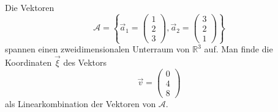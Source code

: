 \begin{beispiel}
Die Vektoren \[
\mathcal{A}=\left\{
\vec{a}_1=
\begin{pmatrix}1\\2\\3\end{pmatrix},
\vec{a}_2=
\begin{pmatrix}3\\2\\1\end{pmatrix}
\right\}
\]
spannen einen zweidimensionalen Unterraum von $\mathbb R^3$ auf.
Man finde die Koordinaten $\vec{\xi}$ des Vektors
\[
\vec{v}
=
\begin{pmatrix}
0\\4\\8
\end{pmatrix}
\]
als Linearkombination der Vektoren von $\mathcal{A}$.


\end{beispiel}
